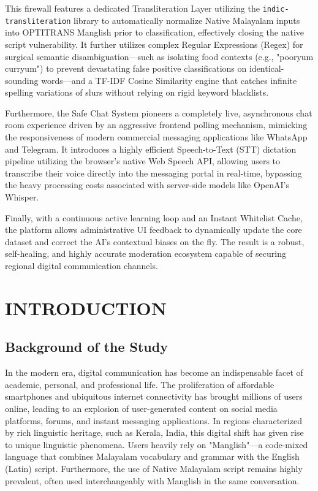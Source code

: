 \documentclass[12pt,a4paper]{report}
\begin{document}
This firewall features a dedicated Transliteration Layer utilizing the \texttt{indic-transliteration} library to automatically normalize Native Malayalam inputs into OPTITRANS Manglish prior to classification, effectively closing the native script vulnerability. It further utilizes complex Regular Expressions (Regex) for surgical semantic disambiguation—such as isolating food contexts (e.g., "pooryum curryum") to prevent devastating false positive classifications on identical-sounding words—and a TF-IDF Cosine Similarity engine that catches infinite spelling variations of slurs without relying on rigid keyword blacklists.

Furthermore, the Safe Chat System pioneers a completely live, asynchronous chat room experience driven by an aggressive frontend polling mechanism, mimicking the responsiveness of modern commercial messaging applications like WhatsApp and Telegram. It introduces a highly efficient Speech-to-Text (STT) dictation pipeline utilizing the browser's native Web Speech API, allowing users to transcribe their voice directly into the messaging portal in real-time, bypassing the heavy processing costs associated with server-side models like OpenAI's Whisper.

Finally, with a continuous active learning loop and an Instant Whitelist Cache, the platform allows administrative UI feedback to dynamically update the core dataset and correct the AI's contextual biases on the fly. The result is a robust, self-healing, and highly accurate moderation ecosystem capable of securing regional digital communication channels.

\clearpage
\tableofcontents
\listoffigures

\clearpage
{}
\setcounter{page}{1}

\chapter{INTRODUCTION}

\section{Background of the Study}
In the modern era, digital communication has become an indispensable facet of academic, personal, and professional life. The proliferation of affordable smartphones and ubiquitous internet connectivity has brought millions of users online, leading to an explosion of user-generated content on social media platforms, forums, and instant messaging applications. In regions characterized by rich linguistic heritage, such as Kerala, India, this digital shift has given rise to unique linguistic phenomena. Users heavily rely on "Manglish"—a code-mixed language that combines Malayalam vocabulary and grammar with the English (Latin) script. Furthermore, the use of Native Malayalam script remains highly prevalent, often used interchangeably with Manglish in the same conversation.
\end{document}
